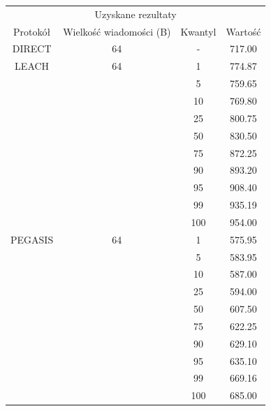 \documentclass[a4paper,12pt,twoside,openany]{report}
\begin{document}
\begin{longtable}{*{4}{c}}
\toprule
\multicolumn{4}{c}{Uzyskane rezultaty} \\
Protokół	& Wielkość wiadomości (B)	& Kwantyl	& Wartość \\
\midrule
\endhead
DIRECT	& 64 	& -	& 717.00 \\*
\midrule
LEACH	& 64	& 1	& 774.87 \\*
	&	& 5	& 759.65 \\*
	&	& 10	& 769.80 \\*
	&	& 25	& 800.75 \\*
	&	& 50	& 830.50 \\*
	&	& 75	& 872.25 \\*
	&	& 90	& 893.20 \\*
	&	& 95	& 908.40 \\*
	&	& 99	& 935.19 \\*
	&	& 100	& 954.00 \\*
\midrule
PEGASIS	& 64	& 1	& 575.95 \\*
	&	& 5	& 583.95 \\*
	&	& 10	& 587.00 \\*
	&	& 25	& 594.00 \\*
	&	& 50	& 607.50 \\*
	&	& 75	& 622.25 \\*
	&	& 90	& 629.10 \\*
	&	& 95	& 635.10 \\*
	&	& 99	& 669.16 \\*
	&	& 100	& 685.00 \\*
\bottomrule
\end{longtable}
\end{document}
